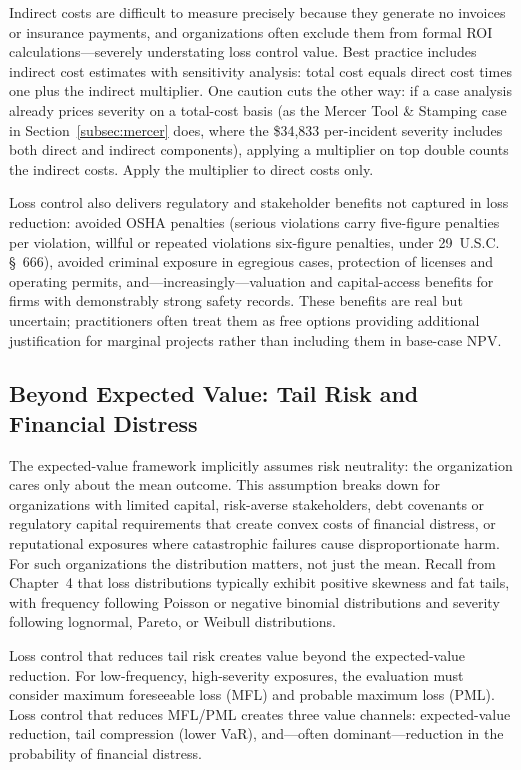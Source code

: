 \documentclass[11pt,openany]{book}
\begin{document}
Indirect costs are difficult to measure precisely because they generate no
invoices or insurance payments, and organizations often exclude them from
formal ROI calculations---severely understating loss control value. Best
practice includes indirect cost estimates with sensitivity analysis: total
cost equals direct cost times one plus the indirect multiplier. One caution
cuts the other way: if a case analysis already prices severity on a total-cost
basis (as the Mercer Tool \& Stamping case in Section~\ref{subsec:mercer}
does, where the \$34{,}833 per-incident severity includes both direct and
indirect components), applying a multiplier on top double counts the indirect
costs. Apply the multiplier to direct costs only.

Loss control also delivers regulatory and stakeholder benefits not captured in
loss reduction: avoided OSHA penalties (serious violations carry five-figure
penalties per violation, willful or repeated violations six-figure penalties,
under 29~U.S.C. \S~666), avoided criminal exposure in egregious cases,
protection of licenses and operating permits, and---increasingly---valuation
and capital-access benefits for firms with demonstrably strong safety records.
These benefits are real but uncertain; practitioners often treat them as free
options providing additional justification for marginal projects rather than
including them in base-case NPV.

\subsection{Beyond Expected Value: Tail Risk and Financial Distress}

The expected-value framework implicitly assumes risk neutrality: the
organization cares only about the mean outcome. This assumption breaks down
for organizations with limited capital, risk-averse stakeholders, debt
covenants or regulatory capital requirements that create convex costs of
financial distress, or reputational exposures where catastrophic failures
cause disproportionate harm. For such organizations the distribution matters,
not just the mean. Recall from Chapter~4 that loss distributions typically
exhibit positive skewness and fat tails, with frequency following Poisson or
negative binomial distributions and severity following lognormal, Pareto, or
Weibull distributions.

Loss control that reduces tail risk creates value beyond the expected-value
reduction. For low-frequency, high-severity exposures, the evaluation must
consider maximum foreseeable loss (MFL) and probable maximum loss (PML). Loss
control that reduces MFL/PML creates three value channels: expected-value
reduction, tail compression (lower VaR), and---often dominant---reduction in
the probability of financial distress.
\end{document}
